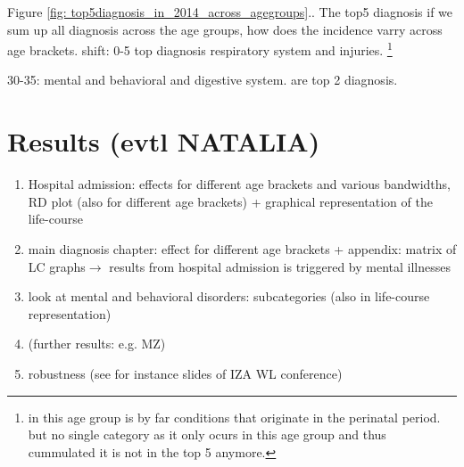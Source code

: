 \documentclass[11pt, a4paper]{article} %
\begin{document}
Figure \ref{fig: top5diagnosis_in_2014_across_agegroups}..
The top5 diagnosis if we sum up all diagnosis across the age groups, how does the incidence varry across age brackets.
shift: 
0-5 top diagnosis respiratory system and injuries. \footnote{ in this age group is by far conditions that originate in the perinatal period. but no single category as it only ocurs in this age group and thus cummulated it is not in the top 5 anymore. }

30-35: mental and behavioral and digestive system. are top 2 diagnosis.




\section{Results (evtl NATALIA)}\label{sec:results}

\begin{enumerate}
	\item Hospital admission: effects for different age brackets and various bandwidths, RD plot (also for different age brackets) + graphical representation of the life-course
	\item main diagnosis chapter: effect for different age brackets + appendix: matrix of LC graphs\newline $\rightarrow$ results from hospital admission is triggered by mental illnesses
	\item look at mental and behavioral disorders: subcategories (also in life-course representation) 
	\item (further results: e.g. MZ)
	\item robustness (see for instance slides of IZA WL conference)
\end{enumerate}



\end{document}
